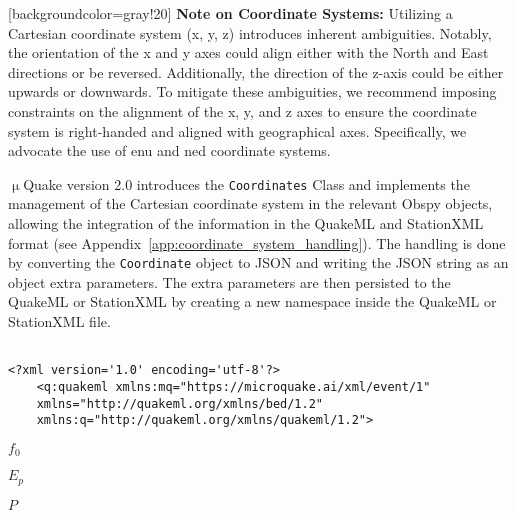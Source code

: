 \documentclass[12pt]{article}
\def\lthtmlcheckvsize{\ifdim\ht\sizebox<\vsize 
  \ifdim\wd\sizebox<\hsize\expandafter\hfill\fi \expandafter\vfill
  \else\expandafter\vss\fi}%
\begin{document}
{\newpage\clearpage
{}%
\begin{mdframed}
[backgroundcolor=gray!20]
\textbf{Note on Coordinate Systems:} Utilizing a Cartesian coordinate system (x, y, z) introduces inherent ambiguities. Notably, the orientation of the x and y axes could align either with the North and East directions or be reversed. Additionally, the direction of the z-axis could be either upwards or downwards. To mitigate these ambiguities, we recommend imposing constraints on the alignment of the x, y, and z axes to ensure the coordinate system is right-handed and aligned with geographical axes. Specifically, we advocate the use of \gls{enu} and \gls{ned} coordinate systems.
\par
$\upmu$Quake\xspace version 2.0 introduces the \texttt{Coordinates} Class and implements the management of the Cartesian coordinate system in the relevant Obspy objects, allowing the integration of the information in the QuakeML and StationXML format (see Appendix~\ref{app:coordinate_system_handling}). The handling is done by converting the \texttt{Coordinate} object to JSON and writing the JSON string as an object extra parameters. The extra parameters are then persisted to the QuakeML or StationXML by creating a new namespace inside the QuakeML or StationXML file. 
\par
\begin{verbatim}

<?xml version='1.0' encoding='utf-8'?>
    <q:quakeml xmlns:mq="https://microquake.ai/xml/event/1" 
    xmlns="http://quakeml.org/xmlns/bed/1.2" 
    xmlns:q="http://quakeml.org/xmlns/quakeml/1.2">\end{verbatim}

\par
\end{mdframed}%
\lthtmlfigureZ
\lthtmlcheckvsize\clearpage}

{\newpage\clearpage
{}%
\(f_0\)%
\lthtmlindisplaymathZ
\lthtmlcheckvsize\clearpage}

{\newpage\clearpage
{}%
\(E_p\)%
\lthtmlindisplaymathZ
\lthtmlcheckvsize\clearpage}

{\newpage\clearpage
{}%
\(P\)%
\lthtmlindisplaymathZ
\lthtmlcheckvsize\clearpage}
\end{document}
